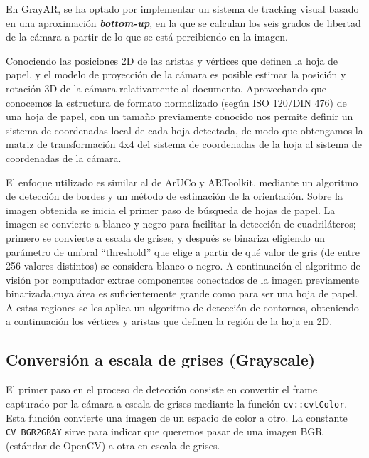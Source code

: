 En GrayAR, se ha optado por implementar un sistema de tracking visual basado en una aproximación \textbf{\textit{bottom-up}}\cite{Marimon}, en la que se calculan los seis grados de libertad de la cámara a partir de lo que se está
percibiendo en la imagen.




Conociendo las posiciones 2D de las aristas y vértices que definen la hoja de papel, y el modelo de
proyección de la cámara es posible estimar la posición y rotación 3D de la cámara relativamente al
documento. Aprovechando que conocemos la estructura de formato normalizado (según ISO 120/DIN 476) de una
hoja de papel, con un tamaño previamente conocido nos permite definir un sistema de coordenadas
local de cada hoja detectada, de modo que obtengamos la matriz de transformación 4x4 del sistema de
coordenadas de la hoja al sistema de coordenadas de la cámara.

El enfoque utilizado es similar al de ArUCo y ARToolkit, mediante un algoritmo de detección de bordes y un
método de estimación de la orientación. Sobre la imagen obtenida se inicia el primer paso de búsqueda de hojas de
papel. La imagen se convierte a blanco y negro para facilitar la detección de cuadriláteros;
primero se convierte a escala de grises, y después se binariza eligiendo un parámetro de
umbral “threshold” que elige a partir de qué valor de gris (de entre 256 valores distintos) se
considera blanco o negro. A continuación el algoritmo de visión por computador
extrae componentes conectados de la imagen previamente binarizada,cuya área es
suficientemente grande como para ser una hoja de papel. A estas regiones se les aplica un algoritmo
de detección de contornos, obteniendo a continuación los vértices y aristas que definen la
región de la hoja en 2D.

\subsection{Conversión a escala de grises (Grayscale)}
El primer paso en el proceso de detección consiste en convertir el frame capturado por la cámara a
escala de grises mediante la función \texttt{cv::cvtColor}. Esta función convierte una imagen de un
espacio de color a otro. La constante \texttt{CV\_BGR2GRAY} sirve para indicar que queremos pasar de
una imagen BGR (estándar de OpenCV) a otra en escala de grises.

